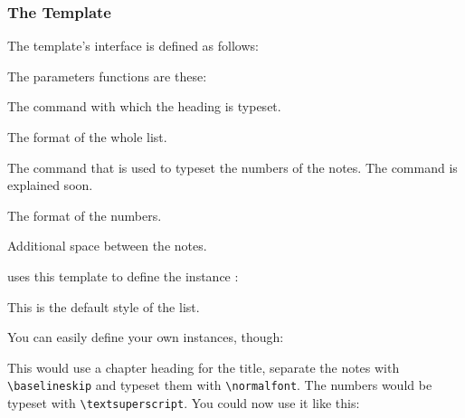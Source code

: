 \documentclass[toc=bib,toc=index]{cnpkgdoc}
\begin{document}
\subsubsection{The  Template}
The  template's interface is defined as follows:
The parameters functions are these:
\begin{description}[style=nextline]
 \item[\code{heading}] The command with which the heading is typeset.
 \item[\code{format}] The format of the whole list.
 \item[\code{number}] The command that is used to typeset the numbers of the
   notes. The command  is explained soon.
 \item[\code{numbers-format}] The format of the numbers.
 \item[\code{notes-sep}] Additional space between the notes.
\end{description}

\enotez uses this template to define the instance :
\begin{beispiel}
\end{beispiel}
This is the default style of the list.

You can easily define your own instances, though:
This would use a chapter heading for the title, separate the notes with
\verb=\baselineskip= and typeset them with \verb=\normalfont=. The numbers would
be typeset with \verb=\textsuperscript=. You could now use it like this:
\begin{beispiel}
 \printendnotes[custom]
\end{beispiel}
\end{document}
